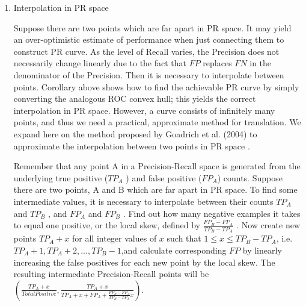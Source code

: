 \documentclass[a4paper,12pt]{article}
\begin{document}
\begin{enumerate}
\begin{proof}
Figure \ref{convex_hull} is graphs about the convex hull. The dashed line in Figure (a) is the convex hull of the fixed points in ROC space. And the the solid line in Figure (b) is the acutual curve. When transformed into PR space, these two curves will become those in Figure (c). The dashed line in Figure(c) is the achievable PR curve which dominates all other valid curves.
\end{proof}

\item Interpolation in PR space

Suppose there are two points which are far apart in PR space. It may yield an over-optimistic estimate of performance when just connecting them to construct PR curve\cite{3:article}. As the level of Recall varies, the Precision does not necessarily change linearly due to the fact that $FP$ replaces $FN$ in the denominator of the Precision. Then it is necessary to interpolate between points. Corollary above shows how to find the achievable PR curve by simply converting the analogous ROC convex hull; this yields the correct interpolation in PR space. However, a curve consists of infinitely many points, and thus we need a practical, approximate method for translation. We expand here on the method proposed by Goadrich et al. (2004) to approximate the interpolation between two points in PR space \cite{8:article}.

Remember that any point A in a Precision-Recall space is generated from the underlying true positive ($TP_A$ ) and false positive ($FP_A$) counts. Suppose there are two points, A and B which are far apart in PR space. To find some intermediate values, it is necessary to interpolate between their counts $TP_A$ and $TP_B$ , and $FP_A$ and $FP_B$ . Find out how many negative examples it takes to equal one positive, or the local skew, defined by $\frac{FP_B-FP_A}{TP_B-TP_A}$ . Now create new points $TP_A+x$ for all integer values of $x$ such that $1 \le x \le TP_B − TP_A$, i.e. $TP_A +1, TP_A +2, ..., TP_B −1$,and calculate corresponding $FP$ by linearly increasing the false positives for each new point by the local skew. The resulting intermediate Precision-Recall points will be $(\frac{TP_A +x}{Total Positive},\frac{TP_A +x}{TP_A+x+FP_A+\frac{FP_B-FP_A}{TP_B-TP_A}x})$.


\end{enumerate}
\end{document}
